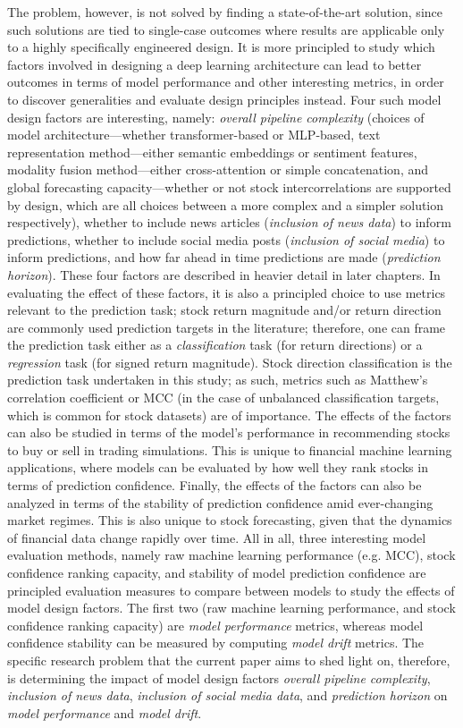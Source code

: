 \documentclass[stu,floatsintext]{apa7}
\begin{document}
The problem, however, is not solved by finding a state-of-the-art solution, since such solutions are tied to single-case outcomes where results are applicable only to a highly specifically engineered design. It is more principled to study which factors involved in designing a deep learning architecture can lead to better outcomes in terms of model performance and other interesting metrics, in order to discover generalities and evaluate design principles instead. Four such model design factors are interesting, namely: \textit{overall pipeline complexity} (choices of model architecture—whether transformer-based or MLP-based, text representation method—either semantic embeddings or sentiment features, modality fusion method—either cross-attention or simple concatenation, and global forecasting capacity—whether or not stock intercorrelations are supported by design, which are all choices between a more complex and a simpler solution respectively), whether to include news articles (\textit{inclusion of news data}) to inform predictions, whether to include social media posts (\textit{inclusion of social media}) to inform predictions, and how far ahead in time predictions are made (\textit{prediction horizon}). These four factors are described in heavier detail in later chapters. In evaluating the effect of these factors, it is also a principled choice to use metrics relevant to the prediction task; stock return magnitude and/or return direction are commonly used prediction targets in the literature; therefore, one can frame the prediction task either as a \textit{classification} task (for return directions) or a \textit{regression} task (for signed return magnitude). Stock direction classification is the prediction task undertaken in this study; as such, metrics such as Matthew's correlation coefficient or MCC (in the case of unbalanced classification targets, which is common for stock datasets) are of importance. The effects of the factors can also be studied in terms of the model's performance in recommending stocks to buy or sell in trading simulations. This is unique to financial machine learning applications, where models can be evaluated by how well they rank stocks in terms of prediction confidence. Finally, the effects of the factors can also be analyzed in terms of the stability of prediction confidence amid ever-changing market regimes. This is also unique to stock forecasting, given that the dynamics of financial data change rapidly over time. All in all, three interesting model evaluation methods, namely raw machine learning performance (e.g. MCC), stock confidence ranking capacity, and stability of model prediction confidence are principled evaluation measures to compare between models to study the effects of model design factors. The first two (raw machine learning performance, and stock confidence ranking capacity) are \textit{model performance} metrics, whereas model confidence stability can be measured by computing \textit{model drift} metrics. The specific research problem that the current paper aims to shed light on, therefore, is determining the impact of model design factors \textit{overall pipeline complexity}, \textit{inclusion of news data}, \textit{inclusion of social media data}, and \textit{prediction horizon} on \textit{model performance} and \textit{model drift}.
\end{document}
